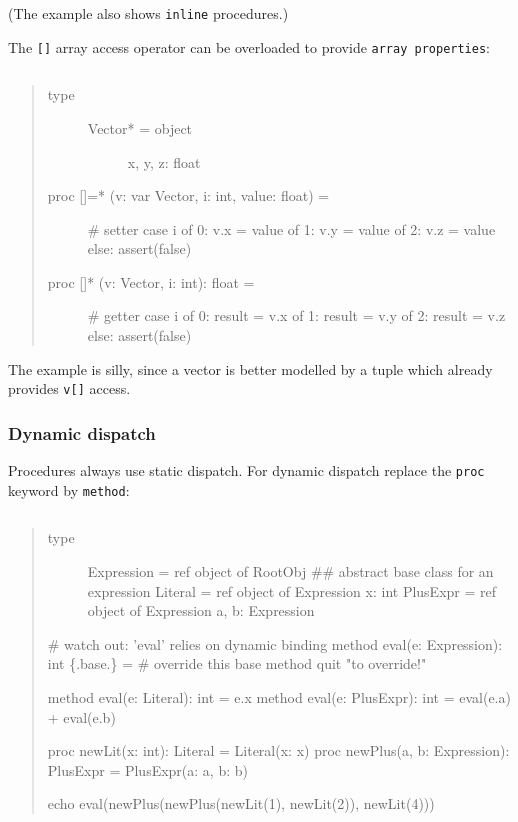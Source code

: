 (The example also shows \texttt{inline} procedures.)

The \texttt{{[}{]}} array access operator can be overloaded to provide
\texttt{array\ properties}:

\begin{verbatim}
\end{verbatim}

\begin{quote}
\begin{description}
\item[type]
\begin{description}
\item[Vector* = object]
x, y, z: float
\end{description}
\item[proc {{[}{]}=}* (v: var Vector, i: int, value: float) =]
\# setter case i of 0: v.x = value of 1: v.y = value of 2: v.z = value
else: assert(false)
\item[proc {{[}{]}}* (v: Vector, i: int): float =]
\# getter case i of 0: result = v.x of 1: result = v.y of 2: result =
v.z else: assert(false)
\end{description}
\end{quote}

The example is silly, since a vector is better modelled by a tuple which
already provides \texttt{v{[}{]}} access.

\hypertarget{dynamic-dispatch}{%
\subsubsection{Dynamic dispatch}\label{dynamic-dispatch}}

Procedures always use static dispatch. For dynamic dispatch replace the
\texttt{proc} keyword by \texttt{method}:

\begin{verbatim}
\end{verbatim}

\begin{quote}
\begin{description}
\item[type]
Expression = ref object of RootObj \#\# abstract base class for an
expression Literal = ref object of Expression x: int PlusExpr = ref
object of Expression a, b: Expression
\end{description}

\# watch out: 'eval' relies on dynamic binding method eval(e:
Expression): int \{.base.\} = \# override this base method quit "to
override!"

method eval(e: Literal): int = e.x method eval(e: PlusExpr): int =
eval(e.a) + eval(e.b)

proc newLit(x: int): Literal = Literal(x: x) proc newPlus(a, b:
Expression): PlusExpr = PlusExpr(a: a, b: b)

echo eval(newPlus(newPlus(newLit(1), newLit(2)), newLit(4)))
\end{quote}

